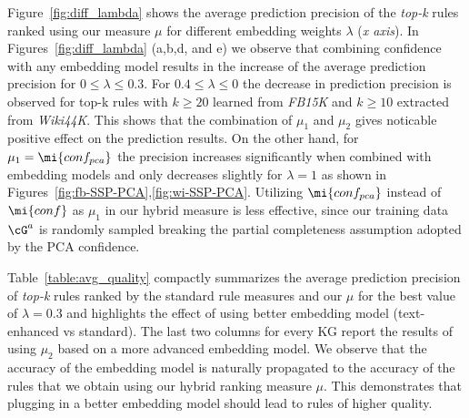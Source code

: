Figure~\ref{fig:diff_lambda} shows the %
average prediction precision %
of the \textit{top-k} rules ranked using our measure $\mu$ for different embedding weights $\lambda$ (\textit{x axis}). In Figures~\ref{fig:diff_lambda} (a,b,d, and e) we observe that combining confidence with any %
embedding model results in the increase %
of the average prediction precision for %
$0\leq \lambda\leq 0.3$. %
For $0.4 \leq \lambda\leq 0$ %
the decrease in prediction precision is observed for top-k rules with $k\geq 20$ %
learned from \textit{FB15K} and $k\geq 10$ extracted from \textit{Wiki44K}. %
This %
shows that the combination of $\mu_1$ and $\mu_2$ gives noticable positive effect %
on the prediction results. On the other hand, for $\mu_1=\mi{conf_{pca}}$ the precision increases significantly when combined with embedding models and only decreases slightly %
for $\lambda=1$ as shown in Figures~\ref{fig:fb-SSP-PCA},\ref{fig:wi-SSP-PCA}. 
Utilizing $\mi{conf_{pca}}$ instead of $\mi{conf}$ as $\mu_1$ in our hybrid measure is less effective, since 
our training data $\cG^a$ is randomly sampled %
breaking the %
partial completeness assumption adopted by the PCA confidence. 

 
Table~\ref{table:avg_quality} compactly summarizes the average prediction precision of \textit{top-k} rules ranked by %
the standard rule measures and our $\mu$ for the best value of $\lambda=0.3$ and highlights the effect of using better embedding model (text-enhanced vs standard).
The last two columns for every KG report the results of using $\mu_2$ based on a more advanced embedding model. We observe that the accuracy of the embedding model is naturally propagated to the accuracy of the rules that we obtain using our hybrid ranking measure $\mu$. This demonstrates that plugging in a better embedding model should lead to rules of higher quality. 


